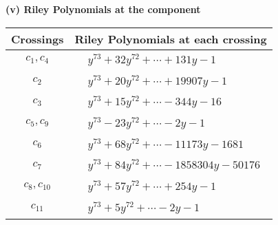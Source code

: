 \documentclass[1p]{elsarticle_modified}
\theoremstyle{definition}
\begin{document}
\newpage\renewcommand{\arraystretch}{1}
\flushleft \textbf{(v) Riley Polynomials at the component}\newline \\
\begin{tabular}{m{50pt}|m{274pt}}
Crossings & \hspace{64pt}Riley Polynomials at each crossing \\
\hline $$\begin{aligned}c_{1},c_{4}\end{aligned}$$&$\begin{aligned}
&y^{73}+32 y^{72}+\cdots+131 y-1
\end{aligned}$\\
\hline $$\begin{aligned}c_{2}\end{aligned}$$&$\begin{aligned}
&y^{73}+20 y^{72}+\cdots+19907 y-1
\end{aligned}$\\
\hline $$\begin{aligned}c_{3}\end{aligned}$$&$\begin{aligned}
&y^{73}+15 y^{72}+\cdots-344 y-16
\end{aligned}$\\
\hline $$\begin{aligned}c_{5},c_{9}\end{aligned}$$&$\begin{aligned}
&y^{73}-23 y^{72}+\cdots-2 y-1
\end{aligned}$\\
\hline $$\begin{aligned}c_{6}\end{aligned}$$&$\begin{aligned}
&y^{73}+68 y^{72}+\cdots-11173 y-1681
\end{aligned}$\\
\hline $$\begin{aligned}c_{7}\end{aligned}$$&$\begin{aligned}
&y^{73}+84 y^{72}+\cdots-1858304 y-50176
\end{aligned}$\\
\hline $$\begin{aligned}c_{8},c_{10}\end{aligned}$$&$\begin{aligned}
&y^{73}+57 y^{72}+\cdots+254 y-1
\end{aligned}$\\
\hline $$\begin{aligned}c_{11}\end{aligned}$$&$\begin{aligned}
&y^{73}+5 y^{72}+\cdots-2 y-1
\end{aligned}$\\
\hline
\end{tabular}\\~\\
\end{document}
